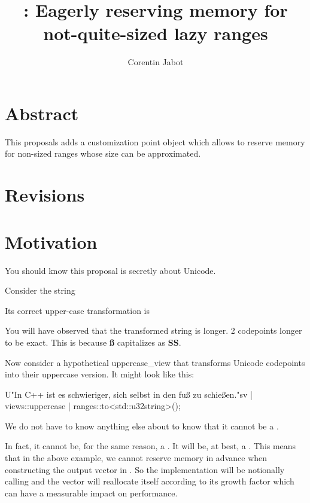 \documentclass{wg21}
\title{\tcode{size\_hint}: Eagerly reserving memory for not-quite-sized lazy ranges}
\author{Corentin Jabot}{corentin.jabot@gmail.com}
\begin{document}
\maketitle

\section{Abstract}

This proposals adds a  customization point object which allows  to
reserve memory for non-sized ranges whose size can be approximated.

\section{Revisions}

\section{Motivation}

You should know this proposal is secretly about Unicode.

Consider the string


Its correct upper-case transformation is


You will have observed that the transformed string is longer.
2 codepoints longer to be exact. This is because \textbf{ß} capitalizes as \textbf{SS}.

Now consider a hypothetical uppercase_view that transforms Unicode codepoints into their uppercase version.
It might look like this:

\begin{colorblock}
U"In C++ ist es schwieriger, sich selbst in den fuß zu schießen."sv
    | views::uppercase
    | ranges::to<std::u32string>();
\end{colorblock}

We do not have to know anything else about  to know that it cannot be a .

In fact, it cannot be, for the same reason, a .  It will be, at best, a .
This means that in the above example, we cannot reserve memory in advance when constructing the output vector in .
So the implementation will be notionally calling  and the vector will reallocate itself according to its growth factor
which can have a measurable impact on performance.
\end{document}
